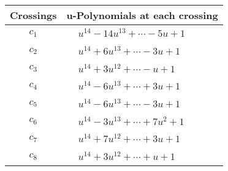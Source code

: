 \documentclass[1p]{elsarticle_modified}
\theoremstyle{definition}
\begin{document}
\begin{tabular}{m{50pt}|m{274pt}}
Crossings & \hspace{64pt}u-Polynomials at each crossing \\
\hline $$\begin{aligned}c_{1}\end{aligned}$$&$\begin{aligned}
&u^{14}-14 u^{13}+\cdots-5 u+1
\end{aligned}$\\
\hline $$\begin{aligned}c_{2}\end{aligned}$$&$\begin{aligned}
&u^{14}+6 u^{13}+\cdots-3 u+1
\end{aligned}$\\
\hline $$\begin{aligned}c_{3}\end{aligned}$$&$\begin{aligned}
&u^{14}+3 u^{12}+\cdots- u+1
\end{aligned}$\\
\hline $$\begin{aligned}c_{4}\end{aligned}$$&$\begin{aligned}
&u^{14}-6 u^{13}+\cdots+3 u+1
\end{aligned}$\\
\hline $$\begin{aligned}c_{5}\end{aligned}$$&$\begin{aligned}
&u^{14}-6 u^{13}+\cdots-3 u+1
\end{aligned}$\\
\hline $$\begin{aligned}c_{6}\end{aligned}$$&$\begin{aligned}
&u^{14}-3 u^{13}+\cdots+7 u^2+1
\end{aligned}$\\
\hline $$\begin{aligned}c_{7}\end{aligned}$$&$\begin{aligned}
&u^{14}+7 u^{12}+\cdots+3 u+1
\end{aligned}$\\
\hline $$\begin{aligned}c_{8}\end{aligned}$$&$\begin{aligned}
&u^{14}+3 u^{12}+\cdots+u+1
\end{aligned}$\\

\end{tabular}
\end{document}
